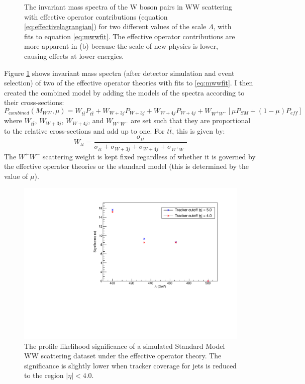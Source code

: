 \documentclass[10pt]{ucscthesisbs}
\begin{document}
\begin{figure}
\begin{subfigure}[b]{8cm}
    \end{subfigure}
\caption{The invariant mass spectra of the W boson pairs in WW scattering with effective operator contributions (equation \ref{eq:effectivelagrangian}) for two different values of the scale $\Lambda$, with fits to equation \ref{eq:mwwfit}. The effective operator contributions are more apparent in (b) because the scale of new physics is lower, causing effects at lower energies.}
\label{fig:spectrumfits}
\end{figure}
Figure \ref{fig:spectrumfits} shows invariant mass spectra (after detector simulation and event selection) of two of the effective operator theories with fits to \ref{eq:mwwfit}.
I then created the combined model by adding the models of the spectra according to their cross-sections:
\begin{equation}
P_{combined}(M_{WW}, \mu) = W_{t\bar{t}}P_{t\bar{t}} + W_{W+3j}P_{W+3j} + W_{W+4j}P_{W+4j} + W_{W^+W^-}[\mu P_{SM} + (1-\mu)P_{eff}]
\end{equation}
where $W_{t\bar{t}}$, $W_{W+3j}$, $W_{W+4j}$, and $W_{W^+W^-}$ are set such that they are proportional to the relative cross-sections and add up to one. For $t\bar{t}$, this is given by:
\begin{equation}
W_{t\bar{t}} = \frac{\sigma_{t\bar{t}}}{\sigma_{t\bar{t}} + \sigma_{W+3j} + \sigma_{W+4j} + \sigma_{W^+W^-}}
\end{equation}
The $W^+W^-$ scattering weight is kept fixed regardless of whether it is governed by the effective operator theories or the standard model (this is determined by the value of $\mu$). 
\begin{figure}
\includegraphics[width=\linewidth]{images/SignificancePlot}
\caption{The profile likelihood significance of a simulated Standard Model WW scattering dataset under the effective operator theory. The significance is slightly lower when tracker coverage for jets is reduced to the region $|\eta| < 4.0$.}
\label{fig:SignificancePlot}
\end{figure}
\end{document}

